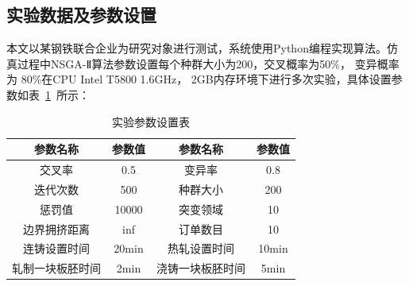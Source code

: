 \documentclass{whutmod}
\begin{document}
       \subsection{实验数据及参数设置}
        本文以某钢铁联合企业为研究对象进行测试，系统使用Python编程实现算法。仿真过程中NSGA-Ⅱ算法参数设置每个种群大小为200，交叉概率为50\%， 变异概率为 80\%在CPU Intel T5800 1.6GHz， 2GB内存环境下进行多次实验，具体设置参数如表~\ref{biaozi}~所示：
        
        \begin{table}[H]
        	\centering		
        	\caption{实验参数设置表}\label{biaozi}
        	\begin{tabular}{cccc}
        		\toprule[2pt]
        		\multicolumn{1}{m{3cm}}{\centering 参数名称}
        		& \multicolumn{1}{m{3cm}}{\centering 参数值}
        		&  \multicolumn{1}{m{3cm}}{\centering 参数名称}
        		& \multicolumn{1}{m{3cm}}{\centering 参数值}
        		\\
        		\midrule[1pt]
        		交叉率 & 0.5 & 变异率& 0.8\\ 
        		迭代次数 &500 &种群大小 & 200\\ 
        		惩罚值 &10000 &突变领域 & 10\\ 
        		边界拥挤距离 &inf &订单数目 & 10\\ 
        		连铸设置时间 &20min &热轧设置时间 & 10min\\ 
        		轧制一块板胚时间 &2min &浇铸一块板胚时间 & 5min\\ 
        		\bottomrule[2pt]	
        	\end{tabular}
        \end{table}
        
\end{document}
